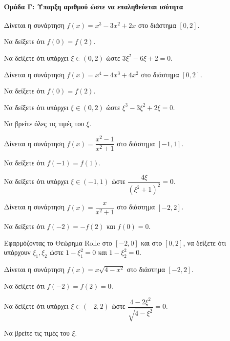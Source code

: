 \documentclass[11pt,a4paper,modern]{FFExercises}
\begin{document}
\paragraph{Ομάδα Γ: Ύπαρξη αριθμού ώστε να επαληθεύεται ισότητα}


\askhsh
Δίνεται η συνάρτηση $f(x) = x^3 - 3x^2 + 2x$ στο διάστημα $[0, 2]$.
\begin{alist}
  \item Να δείξετε ότι $f(0) = f(2)$.
  \item Να δείξετε ότι υπάρχει $\xi \in (0, 2)$ ώστε $3\xi^2 - 6\xi + 2 = 0$.
\end{alist}

\askhsh
Δίνεται η συνάρτηση $f(x) = x^4 - 4x^3 + 4x^2$ στο διάστημα $[0, 2]$.
\begin{alist}
  \item Να δείξετε ότι $f(0) = f(2)$.
  \item Να δείξετε ότι υπάρχει $\xi \in (0, 2)$ ώστε $\xi^3 - 3\xi^2 + 2\xi = 0$.
  \item Να βρείτε όλες τις τιμές του $\xi$.
\end{alist}


\askhsh
Δίνεται η συνάρτηση $f(x) = \dfrac{x^2 - 1}{x^2 + 1}$ στο διάστημα $[-1, 1]$.
\begin{alist}
  \item Να δείξετε ότι $f(-1) = f(1)$.
  \item Να δείξετε ότι υπάρχει $\xi \in (-1, 1)$ ώστε $\dfrac{4\xi}{(\xi^2+1)^2} = 0$.
\end{alist}

\askhsh
Δίνεται η συνάρτηση $f(x) = \dfrac{x}{x^2 + 1}$ στο διάστημα $[-2, 2]$.
\begin{alist}
  \item Να δείξετε ότι $f(-2) = -f(2)$ και $f(0) = 0$.
  \item Εφαρμόζοντας το Θεώρημα Rolle στο $[-2, 0]$ και στο $[0, 2]$, να δείξετε ότι υπάρχουν $\xi_1, \xi_2$ ώστε $1 - \xi_1^2 = 0$ και $1 - \xi_2^2 = 0$.
\end{alist}


\askhsh
Δίνεται η συνάρτηση $f(x) = x\sqrt{4-x^2}$ στο διάστημα $[-2, 2]$.
\begin{alist}
  \item Να δείξετε ότι $f(-2) = f(2) = 0$.
  \item Να δείξετε ότι υπάρχει $\xi \in (-2, 2)$ ώστε $\dfrac{4 - 2\xi^2}{\sqrt{4-\xi^2}} = 0$.
  \item Να βρείτε τις τιμές του $\xi$.
\end{alist}
\end{document}
